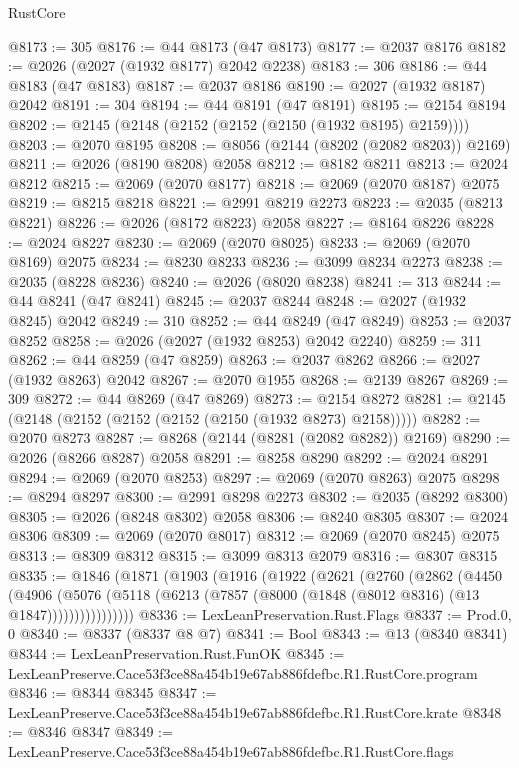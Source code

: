 \begin{lexlean}{RustCore}
\begin{coremodule}
@8173 := 305
@8176 := @44 @8173 (@47 @8173)
@8177 := @2037 @8176
@8182 := @2026 (@2027 (@1932 @8177) @2042 @2238)
@8183 := 306
@8186 := @44 @8183 (@47 @8183)
@8187 := @2037 @8186
@8190 := @2027 (@1932 @8187) @2042
@8191 := 304
@8194 := @44 @8191 (@47 @8191)
@8195 := @2154 @8194
@8202 := @2145 (@2148 (@2152 (@2152 (@2150 (@1932 @8195) @2159))))
@8203 := @2070 @8195
@8208 := @8056 (@2144 (@8202 (@2082 @8203)) @2169)
@8211 := @2026 (@8190 @8208) @2058
@8212 := @8182 @8211
@8213 := @2024 @8212
@8215 := @2069 (@2070 @8177)
@8218 := @2069 (@2070 @8187) @2075
@8219 := @8215 @8218
@8221 := @2991 @8219 @2273
@8223 := @2035 (@8213 @8221)
@8226 := @2026 (@8172 @8223) @2058
@8227 := @8164 @8226
@8228 := @2024 @8227
@8230 := @2069 (@2070 @8025)
@8233 := @2069 (@2070 @8169) @2075
@8234 := @8230 @8233
@8236 := @3099 @8234 @2273
@8238 := @2035 (@8228 @8236)
@8240 := @2026 (@8020 @8238)
@8241 := 313
@8244 := @44 @8241 (@47 @8241)
@8245 := @2037 @8244
@8248 := @2027 (@1932 @8245) @2042
@8249 := 310
@8252 := @44 @8249 (@47 @8249)
@8253 := @2037 @8252
@8258 := @2026 (@2027 (@1932 @8253) @2042 @2240)
@8259 := 311
@8262 := @44 @8259 (@47 @8259)
@8263 := @2037 @8262
@8266 := @2027 (@1932 @8263) @2042
@8267 := @2070 @1955
@8268 := @2139 @8267
@8269 := 309
@8272 := @44 @8269 (@47 @8269)
@8273 := @2154 @8272
@8281 := @2145 (@2148 (@2152 (@2152 (@2152 (@2150 (@1932 @8273) @2158)))))
@8282 := @2070 @8273
@8287 := @8268 (@2144 (@8281 (@2082 @8282)) @2169)
@8290 := @2026 (@8266 @8287) @2058
@8291 := @8258 @8290
@8292 := @2024 @8291
@8294 := @2069 (@2070 @8253)
@8297 := @2069 (@2070 @8263) @2075
@8298 := @8294 @8297
@8300 := @2991 @8298 @2273
@8302 := @2035 (@8292 @8300)
@8305 := @2026 (@8248 @8302) @2058
@8306 := @8240 @8305
@8307 := @2024 @8306
@8309 := @2069 (@2070 @8017)
@8312 := @2069 (@2070 @8245) @2075
@8313 := @8309 @8312
@8315 := @3099 @8313 @2079
@8316 := @8307 @8315
@8335 := @1846
    (@1871
      (@1903
        (@1916
          (@1922
            (@2621
              (@2760
                (@2862
                  (@4450
                    (@4906
                      (@5076
                        (@5118 (@6213 (@7857 (@8000 (@1848 (@8012 @8316) (@13 @1847))))))))))))))))
@8336 := LexLeanPreservation.Rust.Flags
@8337 := Prod.{0, 0}
@8340 := @8337 (@8337 @8 @7)
@8341 := Bool
@8343 := @13 (@8340 @8341)
@8344 := LexLeanPreservation.Rust.FunOK
@8345 := LexLeanPreserve.Cace53f3ce88a454b19e67ab886fdefbc.R1.RustCore.program
@8346 := @8344 @8345
@8347 := LexLeanPreserve.Cace53f3ce88a454b19e67ab886fdefbc.R1.RustCore.krate
@8348 := @8346 @8347
@8349 := LexLeanPreserve.Cace53f3ce88a454b19e67ab886fdefbc.R1.RustCore.flags

\end{coremodule}
\end{lexlean}
